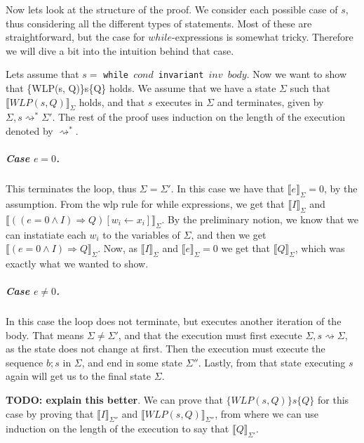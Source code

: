 Now lets look at the structure of the proof.
We consider each possible case of $s$, thus considering all the different types of statements.
Most of these are straightforward, but the case for $while$-expressions is somewhat tricky.
Therefore we will dive a bit into the intuition behind that case.

Lets assume that $s =$ \texttt{while $cond$ invariant $inv$ $body$}.
Now we want to show that \{WLP(s, Q)\}s\{Q\} holds. We assume that we have a state $\Sigma$ such that $\llbracket WLP(s, Q)\rrbracket_{\Sigma}$ holds, and that $s$ executes in $\Sigma$ and terminates, given by $\Sigma, s \rightsquigarrow^{*} \Sigma '$.
The rest of the proof uses induction on the length of the execution denoted by $\rightsquigarrow^{*}$.

\subparagraph{Case $e=0$.}
This terminates the loop, thus $\Sigma = \Sigma'$.
In this case we have that $\llbracket e \rrbracket_{\Sigma} = 0$, by the assumption.
From the wlp rule for while expressions, we get that $\llbracket I \rrbracket_{\Sigma}$ and $\llbracket ((e = 0 \land I) \Rightarrow Q) [ w_{i} \leftarrow x_{i}] \rrbracket_{\Sigma}$.
By the preliminary notion, we know that we can instatiate each $w_{i}$ to the variables of $\Sigma$, and then we get $\llbracket (e = 0 \land I) \Rightarrow Q \rrbracket_{\Sigma}$.
Now, as $\llbracket I \rrbracket_{\Sigma}$ and $\llbracket e \rrbracket_{\Sigma} = 0$ we get that $\llbracket Q \rrbracket_{\Sigma}$, which was exactly what we wanted to show.

\subparagraph{Case $e \neq 0 $.}
In this case the loop does not terminate, but executes another iteration of the body.
That means $\Sigma \neq \Sigma'$, and that the execution must first execute $\Sigma, s \rightsquigarrow \Sigma$, as the state does not change at first.
Then the execution must execute the sequence $b;s$ in $\Sigma$, and end in some state $\Sigma''$.
Lastly, from that state executing $s$ again will get us to the final state $\Sigma$.

\textbf{TODO: explain this better}.
We can prove that $\{WLP(s, Q)\}s\{Q\}$ for this case by proving that $\llbracket I \rrbracket_{\Sigma''}$ and $\llbracket WLP(s, Q)\rrbracket_{\Sigma''}$, from where we can use induction on the length of the execution to say that $\llbracket Q \rrbracket_{\Sigma'}$.

